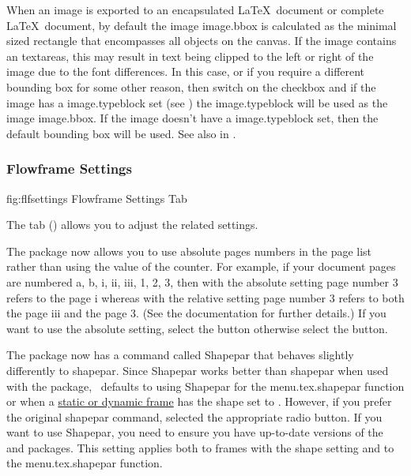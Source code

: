 
When an image is exported to an encapsulated \LaTeX\ document
or complete \LaTeX\ document, by default the image \gls{image.bbox}
is calculated as the minimal sized rectangle that encompasses all
\glspl{object} on the \gls{canvas}. If the image contains an
\glspl*{textarea}, this may result in text being clipped to the left
or right of the image due to the font differences. In this case, or
if you require a different bounding box for some other reason, then
switch on the 
\gls*{checkbox} and if the image has a \gls{image.typeblock} set
(see ) the \gls{image.typeblock} will be used as the image
\gls{image.bbox}. If the image doesn't have a \gls{image.typeblock} set, then the
default bounding box will be used. See also 
in .


\subsubsection{Flowframe Settings}\label{sec:texconfigflf}


\FloatFig
 {fig:flfsettings}
 {}
 {Flowframe Settings Tab}

The  tab
() allows you to adjust the
 related settings.

The  package now allows you to use absolute pages
numbers in the page list rather than using the value of the
 counter. For example, if your document pages are numbered
a, b, i, ii, iii, 1, 2, 3, then with the absolute setting page
number 3 refers to the page  i whereas with the
relative setting page number 3 refers to both the page
 iii and the page  3. (See the
 documentation for further details.) If you want to
use the absolute setting, select the
 button otherwise select the
 button.


The  package now has a command called
\gls{Shapepar} that behaves slightly differently to
\gls{shapepar}. Since \gls{Shapepar} works better than
\gls{shapepar} when used with the  package,
\FlowframTk\ defaults to using \gls{Shapepar} for the
\gls{menu.tex.shapepar} function or when a
\hyperref[sec:flowframe]{static or dynamic frame} has the
shape set to . However, if
you prefer the original \gls{shapepar} command, selected the
appropriate  radio button.
If you want to use \gls{Shapepar}, you need to ensure you have
up-to-date versions of the  and 
packages. This setting applies both to frames with the
 shape setting and to the
\gls{menu.tex.shapepar} function.

